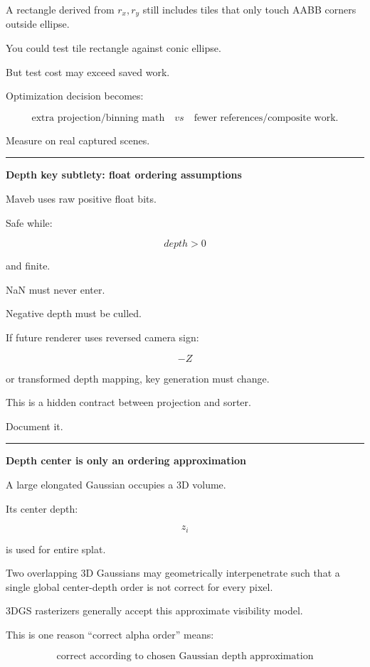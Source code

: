 A rectangle derived from \(r_x,r_y\) still includes tiles that only touch AABB corners outside ellipse.

You could test tile rectangle against conic ellipse.

But test cost may exceed saved work.

Optimization decision becomes:

\[
\boxed{
\text{extra projection/binning math}
\quad vs\quad
\text{fewer references/composite work}.
}
\]

Measure on real captured scenes.

\begin{center}\rule{0.5\linewidth}{0.5pt}\end{center}

\textbf{Depth key subtlety: float ordering assumptions}

Maveb uses raw positive float bits.

Safe while:

\[
depth>0
\]

and finite.

NaN must never enter.

Negative depth must be culled.

If future renderer uses reversed camera sign:

\[
-Z
\]

or transformed depth mapping, key generation must change.

This is a hidden contract between projection and sorter.

Document it.

\begin{center}\rule{0.5\linewidth}{0.5pt}\end{center}

\textbf{Depth center is only an ordering approximation}

A large elongated Gaussian occupies a 3D volume.

Its center depth:

\[
z_i
\]

is used for entire splat.

Two overlapping 3D Gaussians may geometrically interpenetrate such that a single global center-depth order is not correct for every pixel.

3DGS rasterizers generally accept this approximate visibility model.

This is one reason ``correct alpha order'' means:

\[
\boxed{
\text{correct according to chosen Gaussian depth approximation}
}
\]

